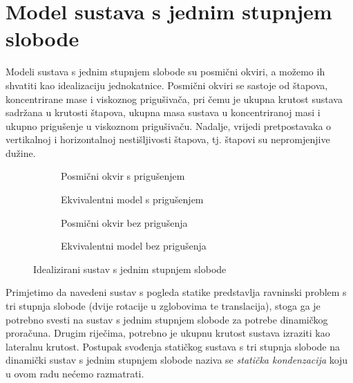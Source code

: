 \section{Model sustava s jednim stupnjem slobode}
Modeli sustava s jednim stupnjem slobode su posmični okviri, a možemo ih shvatiti
kao idealizaciju jednokatnice. Posmični okviri se sastoje od štapova, koncentrirane
mase i viskoznog prigušivača, pri čemu je ukupna krutost sustava sadržana u krutosti
štapova, ukupna masa sustava u koncentriranoj masi i ukupno prigušenje u viskoznom
prigušivaču. Nadalje, vrijedi pretpostavaka o vertikalnoj i horizontalnoj
nestišljivosti štapova, tj. štapovi su nepromjenjive dužine.
\par
\begin{figure}[H]
    \begin{subfigure}[b]{0.5\textwidth}\label{fig:priguseni-sustav-sdf}
        \centering
        
        \caption{Posmični okvir s prigušenjem}
    \end{subfigure}
    \hfill
    \begin{subfigure}[b]{0.5\textwidth}\label{fig:priguseni-ekvivalentni-sustav-sdf}
        \centering
        
        \caption{Ekvivalentni model s prigušenjem}
    \end{subfigure}
    \vfill
    \begin{subfigure}[b]{0.5\textwidth}\label{fig:nepriguseni-sustav-sdf}
        \centering
        
        \caption{Posmični okvir bez prigušenja}
    \end{subfigure}
    \hfill
    \begin{subfigure}[b]{0.5\textwidth}\label{fig:nepriguseni-ekvivalentni-sustav-sdf}
        \centering
        
        \caption{Ekvivalentni model bez prigušenja}
    \end{subfigure}
    \caption{Idealizirani sustav s jednim stupnjem slobode}
\end{figure}

Primjetimo da navedeni sustav s pogleda statike predstavlja ravninski problem s tri
stupnja slobode (dvije rotacije u zglobovima te translacija), stoga ga je potrebno
svesti na sustav s jednim stupnjem slobode za potrebe dinamičkog proračuna. Drugim
riječima, potrebno je ukupnu krutost sustava izraziti kao lateralnu krutost.
Postupak svođenja statičkog sustava s tri stupnja slobode na dinamički sustav s jednim 
stupnjem slobode naziva se \textit{statička kondenzacija} koju u ovom radu nećemo 
razmatrati.
\newpage

